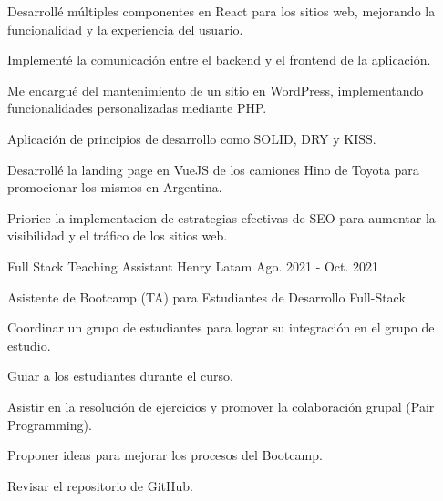 \begin{cventries}
{\begin{cvitems}
        \item {Desarrollé múltiples componentes en React para los sitios web, mejorando la funcionalidad y la experiencia del usuario.}
        \item {Implementé la comunicación entre el backend y el frontend de la aplicación.}
        \item {Me encargué del mantenimiento de un sitio en WordPress, implementando funcionalidades personalizadas mediante PHP.}
        \item {Aplicación de principios de desarrollo como SOLID, DRY y KISS.}
        \item {Desarrollé la landing page en VueJS de los camiones Hino de Toyota para promocionar los mismos en Argentina.}
        \item { Priorice la implementacion de estrategias efectivas de SEO para aumentar la visibilidad y el tráfico de los sitios web.}
      \end{cvitems}
    }
  \vspace{5.5mm}
  \cventry
    {Full Stack Teaching Assistant} %
    {Henry} %
    {Latam} %
    {Ago. 2021 - Oct. 2021} %
    {
      \begin{cvitems} %
        \item {Asistente de Bootcamp (TA) para Estudiantes de Desarrollo Full-Stack}
        \item {Coordinar un grupo de estudiantes para lograr su integración en el grupo de estudio.}
        \item{Guiar a los estudiantes durante el curso.}
        \item{Asistir en la resolución de ejercicios y promover la colaboración grupal (Pair Programming).}
        \item{Proponer ideas para mejorar los procesos del Bootcamp.}
        \item{Revisar el repositorio de GitHub.}
      \end{cvitems}
    }

\end{cventries}

